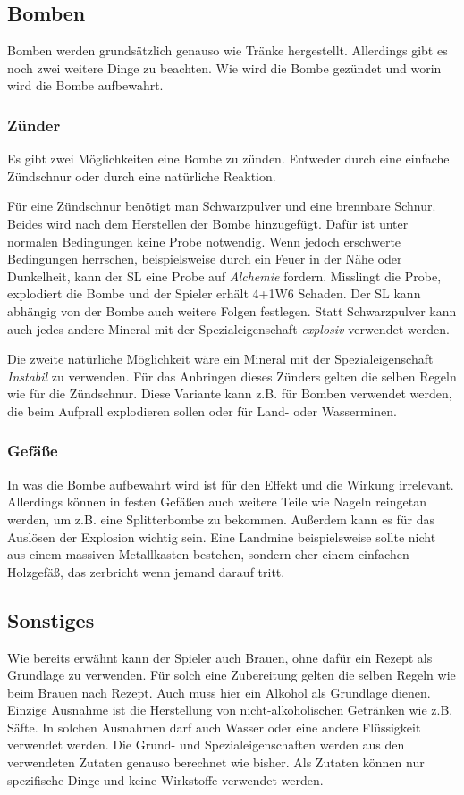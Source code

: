 \subsection{Bomben}
Bomben werden grundsätzlich genauso wie Tränke hergestellt. Allerdings gibt es noch zwei weitere Dinge zu beachten. Wie wird die Bombe gezündet und worin wird die Bombe aufbewahrt.

\subsubsection{Zünder}
Es gibt zwei Möglichkeiten eine Bombe zu zünden. Entweder durch eine einfache Zündschnur oder durch eine natürliche Reaktion.

Für eine Zündschnur benötigt man Schwarzpulver und eine brennbare Schnur. Beides wird nach dem Herstellen der Bombe hinzugefügt. Dafür ist unter normalen Bedingungen keine Probe notwendig. Wenn jedoch erschwerte Bedingungen herrschen, beispielsweise durch ein Feuer in der Nähe oder Dunkelheit, kann der SL eine Probe auf \textit{Alchemie} fordern. Misslingt die Probe, explodiert die Bombe und der Spieler erhält 4+1W6 Schaden. Der SL kann abhängig von der Bombe auch weitere Folgen festlegen. Statt Schwarzpulver kann auch jedes andere Mineral mit der Spezialeigenschaft \textit{explosiv} verwendet werden.

Die zweite natürliche Möglichkeit wäre ein Mineral mit der Spezialeigenschaft \textit{Instabil} zu verwenden. Für das Anbringen dieses Zünders gelten die selben Regeln wie für die Zündschnur. Diese Variante kann z.B. für Bomben verwendet werden, die beim Aufprall explodieren sollen oder für Land- oder Wasserminen.

\subsubsection{Gefäße}
In was die Bombe aufbewahrt wird ist für den Effekt und die Wirkung irrelevant. Allerdings können in festen Gefäßen auch weitere Teile wie Nageln reingetan werden, um z.B. eine Splitterbombe zu bekommen. Außerdem kann es für das Auslösen der Explosion wichtig sein. Eine Landmine beispielsweise sollte nicht aus einem massiven Metallkasten bestehen, sondern eher einem einfachen Holzgefäß, das zerbricht wenn jemand darauf tritt.

\subsection{Sonstiges}
Wie bereits erwähnt kann der Spieler auch Brauen, ohne dafür ein Rezept als Grundlage zu verwenden. Für solch eine Zubereitung gelten die selben Regeln wie beim Brauen nach Rezept. Auch muss hier ein Alkohol als Grundlage dienen. Einzige Ausnahme ist die Herstellung von nicht-alkoholischen Getränken wie z.B. Säfte. In solchen Ausnahmen darf auch Wasser oder eine andere Flüssigkeit verwendet werden. Die Grund- und Spezialeigenschaften werden aus den verwendeten Zutaten genauso berechnet wie bisher. Als Zutaten können nur spezifische Dinge und keine Wirkstoffe verwendet werden.

